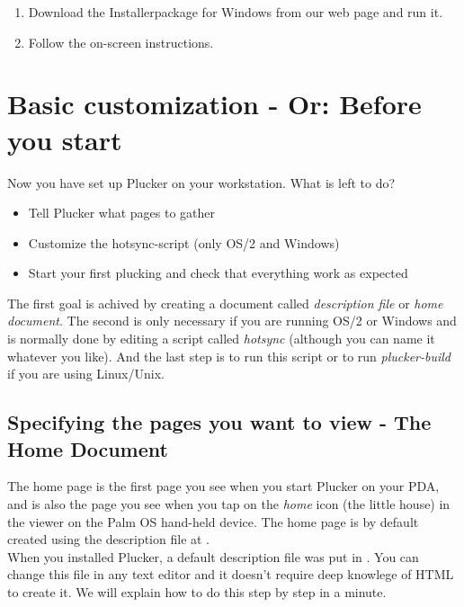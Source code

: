 \begin{enumerate}
  \item Download the Installerpackage for Windows from our web page and
  run it.

  \item Follow the on-screen instructions.
\end{enumerate}

\section{Basic customization - Or: Before you start} \label{sec:basic}

Now you have set up Plucker on your workstation. What is left to do?
\begin{itemize}
	\item Tell Plucker what pages to gather
	\item Customize the hotsync-script (only OS/2 and Windows)
	\item Start your first plucking and check that everything work as
	expected
\end{itemize}

The first goal is achived by creating a document called \emph{description
file} or \emph{home document}. The second is only necessary if you are 
running OS/2 or Windows and is normally done by editing a script called 
\emph{hotsync} (although you can name it whatever you like). And the last 
step is to run this script or to run \emph{plucker-build} if you are 
using Linux/Unix.

\subsection{Specifying the pages you want to view - The Home Document}

The home page is the first page you see when you start Plucker on your
PDA, and is also the page you see when you tap on the \emph{home} icon
(the little house) in the viewer on the Palm OS hand-held device. The
home page is by default created using the description file at
.\\

When you installed Plucker, a default description file was put in
. You can change this file in any text editor
and it doesn't require deep knowlege of HTML to create it. We will 
explain how to do this step by step in a minute.\\

